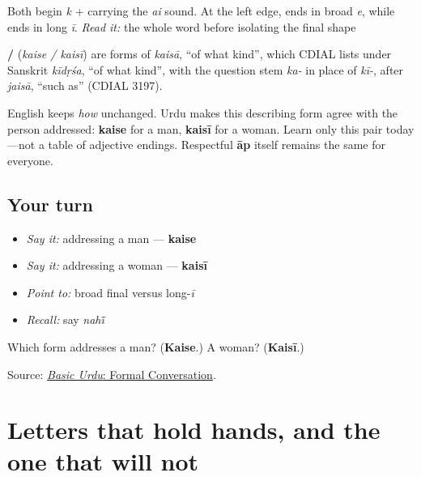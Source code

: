 Both begin \textbf{} \emph{k} + \textbf{} carrying the \emph{ai} sound. At the left edge, \textbf{} ends in broad \textbf{} \emph{e}, while \textbf{} ends in \textbf{} long \emph{ī}. \emph{Read it:} the whole word before isolating the final shape

\begin{cousinweb}
\textbf{ / } (\emph{kaise / kaisī}) are forms of \emph{kaisā}, \textquotedblleft{}of what kind\textquotedblright{}, which CDIAL lists under Sanskrit \emph{kīdṛśa}, \textquotedblleft{}of what kind\textquotedblright{}, with the question stem \emph{ka-} in place of \emph{kī-}, after \emph{jaisā}, \textquotedblleft{}such as\textquotedblright{} (CDIAL 3197).
\end{cousinweb}

\begin{grammarlens}[title={Grammar Lens: one agreement contrast}]
English keeps \emph{how} unchanged. Urdu makes this describing form agree with the person addressed: \textbf{kaise} for a man, \textbf{kaisī} for a woman. Learn only this pair today—not a table of adjective endings. Respectful \textbf{āp} itself remains the same for everyone.
\end{grammarlens}

\subsection*{Your turn}
\begin{itemize}
\raggedright
  \item \emph{Say it:} addressing a man — \textbf{kaise}
  \item \emph{Say it:} addressing a woman — \textbf{kaisī}
  \item \emph{Point to:} broad final \textbf{} versus long-\emph{ī} \textbf{}
  \item \emph{Recall:} say \emph{nahī̃}
\end{itemize}

\begin{tcolorbox}[breakable,colback=teal!4,colframe=teal!35!black,title={Before you move on}]
Which form addresses a man? (\textbf{Kaise}.) A woman? (\textbf{Kaisī}.)

Source: \href{https://openbooks.lib.msu.edu/urdu/chapter/2-4/}{\emph{Basic Urdu}: Formal Conversation}.
\end{tcolorbox}
\section[\texorpdfstring{\ur{سلام} (salām)}{سلام (salām)}]{Letters that hold hands, and the one that will not}

